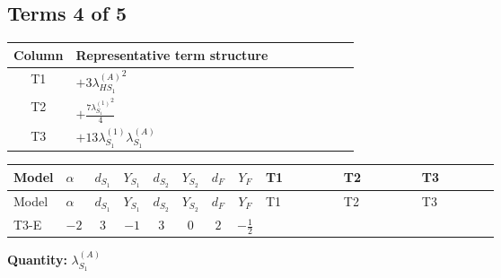 \documentclass[8pt]{article}
\begin{document}
\begin{landscape}
\subsection*{Terms 4 of 5}
\begin{center}
\begin{tabular}{@{}c >{\raggedright\arraybackslash}p{0.82\linewidth}@{}}
\toprule
Column & Representative term structure \\
\midrule
T1 & \(\displaystyle +3 {\lambda_{HS_1}^{(A)}}^2\) \\
\midrule
T2 & \(\displaystyle +\frac{7 {\lambda_{S_1}^{(1)}}^2}{4}\) \\
\midrule
T3 & \(\displaystyle +13 {\lambda_{S_1}^{(1)}} {\lambda_{S_1}^{(A)}}\) \\
\midrule
\bottomrule
\end{tabular}
\end{center}
\smallskip
\tiny
\begin{longtable}{@{}llcccccc >{\raggedright\arraybackslash}p{0.21\linewidth} >{\raggedright\arraybackslash}p{0.21\linewidth} >{\raggedright\arraybackslash}p{0.21\linewidth}@{}}
\toprule
Model & $\alpha$ & $d_{S_1}$ & $Y_{S_1}$ & $d_{S_2}$ & $Y_{S_2}$ & $d_F$ & $Y_F$ & T1 & T2 & T3 \\
\midrule
\endfirsthead
\toprule
Model & $\alpha$ & $d_{S_1}$ & $Y_{S_1}$ & $d_{S_2}$ & $Y_{S_2}$ & $d_F$ & $Y_F$ & T1 & T2 & T3 \\
\midrule
\endhead
T3-E & $-2$ & $3$ & $-1$ & $3$ & $0$ & $2$ & $-\frac{1}{2}$ & \scriptsize\adjustbox{max width=\linewidth}{$\begin{gathered} +3 {\lambda_{HS_1}^{(A)}}^2\end{gathered}$} & \scriptsize\adjustbox{max width=\linewidth}{$\begin{gathered} +\frac{7 {\lambda_{S_1}^{(1)}}^2}{4}\end{gathered}$} & \scriptsize\adjustbox{max width=\linewidth}{$\begin{gathered} +13 {\lambda_{S_1}^{(1)}} {\lambda_{S_1}^{(A)}}\end{gathered}$} \\
\midrule
\bottomrule
\end{longtable}
\clearpage
\noindent\textbf{Quantity: }$\lambda_{S_1}^{(A)}$\par\smallskip

\end{landscape}
\end{document}
